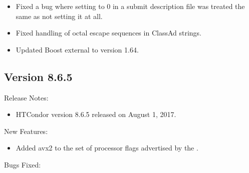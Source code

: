 \begin{itemize}
\item Fixed a bug where setting 
to 0 in a submit description file was treated the same as not setting
it at all.

\item Fixed handling of octal escape sequences in ClassAd strings.

\item Updated Boost external to version 1.64.

\end{itemize}

\subsection*{\label{sec:New-8-6-5}Version 8.6.5}

\noindent Release Notes:

\begin{itemize}

\item HTCondor version 8.6.5 released on August 1, 2017.

\end{itemize}


\noindent New Features:

\begin{itemize}

\item Added avx2 to the set of processor flags advertised by the
.

\end{itemize}

\noindent Bugs Fixed:

